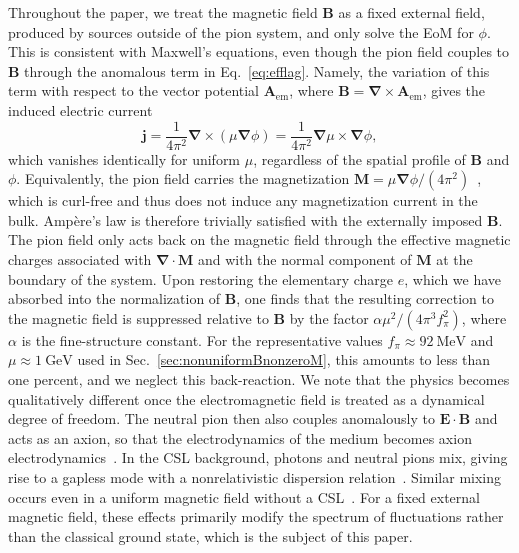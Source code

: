 \documentclass[pdflatex,iicol,sn-mathphys-num]{sn-jnl}
\let\m=\mu
\let\p=\phi
\newcommand{\vek}[1]{\bm{#1}}%
\newcommand{\grad}{\vek\nabla}%
\newcommand{\divg}{\grad\cdot}%
\begin{document}
Throughout the paper, we treat the magnetic field $\vek B$ as a fixed external field, produced by sources outside of the pion system, and only solve the EoM for $\p$. This is consistent with Maxwell's equations, even though the pion field couples to $\vek B$ through the anomalous term in Eq.~\eqref{eq:efflag}. Namely, the variation of this term with respect to the vector potential $\vek A_\text{em}$, where $\vek B=\grad\times\vek A_\text{em}$, gives the induced electric current
\begin{equation}
\vek j=\frac{1}{4\pi^2}\grad\times(\m\grad\p)=\frac{1}{4\pi^2}\grad\m\times\grad\p,
\label{eq:current}
\end{equation}
which vanishes identically for uniform $\m$, regardless of the spatial profile of $\vek B$ and $\p$. Equivalently, the pion field carries the magnetization $\vek M=\m\grad\p/(4\pi^2)$~\cite{Son:2007ny}, which is curl-free and thus does not induce any magnetization current in the bulk. Ampère's law is therefore trivially satisfied with the externally imposed $\vek B$. The pion field only acts back on the magnetic field through the effective magnetic charges associated with $\divg\vek M$ and with the normal component of $\vek M$ at the boundary of the system. Upon restoring the elementary charge $e$, which we have absorbed into the normalization of $\vek B$, one finds that the resulting correction to the magnetic field is suppressed relative to $\vek B$ by the factor $\alpha\m^2/(4\pi^3f_\pi^2)$, where $\alpha$ is the fine-structure constant. For the representative values $f_\pi\approx92~\text{MeV}$ and $\m\approx1~\text{GeV}$ used in Sec.~\ref{sec:nonuniformBnonzeroM}, this amounts to less than one percent, and we neglect this back-reaction. We note that the physics becomes qualitatively different once the electromagnetic field is treated as a dynamical degree of freedom. The neutral pion then also couples anomalously to $\vek E\cdot\vek B$ and acts as an axion, so that the electrodynamics of the medium becomes axion electrodynamics~\cite{Yamamoto:2015maz}. In the CSL background, photons and neutral pions mix, giving rise to a gapless mode with a nonrelativistic dispersion relation~\cite{Brauner:2017mui}. Similar mixing occurs even in a uniform magnetic field without a CSL~\cite{BraunerKadam2017thermo,SogabeYamamoto2019}. For a fixed external magnetic field, these effects primarily modify the spectrum of fluctuations rather than the classical ground state, which is the subject of this paper.
\end{document}

